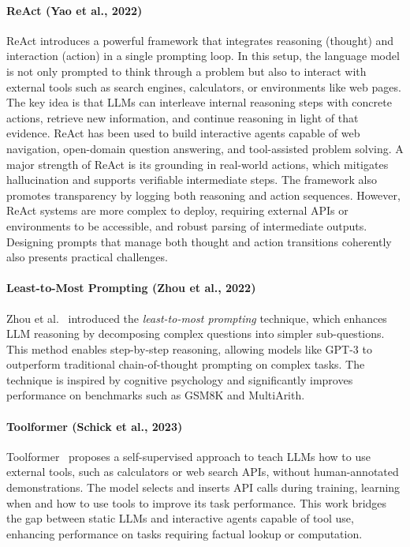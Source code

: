 \paragraph{ReAct (Yao et al., 2022)}
ReAct introduces a powerful framework that integrates reasoning (thought) and interaction (action) in a single prompting loop. In this setup, the language model is not only prompted to think through a problem but also to interact with external tools such as search engines, calculators, or environments like web pages. The key idea is that LLMs can interleave internal reasoning steps with concrete actions, retrieve new information, and continue reasoning in light of that evidence. ReAct has been used to build interactive agents capable of web navigation, open-domain question answering, and tool-assisted problem solving. A major strength of ReAct is its grounding in real-world actions, which mitigates hallucination and supports verifiable intermediate steps. The framework also promotes transparency by logging both reasoning and action sequences. However, ReAct systems are more complex to deploy, requiring external APIs or environments to be accessible, and robust parsing of intermediate outputs. Designing prompts that manage both thought and action transitions coherently also presents practical challenges.

\paragraph{Least-to-Most Prompting (Zhou et al., 2022)}  
Zhou et al.~\cite{zhou2022least} introduced the \emph{least-to-most prompting} technique, which enhances LLM reasoning by decomposing complex questions into simpler sub-questions. This method enables step-by-step reasoning, allowing models like GPT-3 to outperform traditional chain-of-thought prompting on complex tasks. The technique is inspired by cognitive psychology and significantly improves performance on benchmarks such as GSM8K and MultiArith.

\paragraph{Toolformer (Schick et al., 2023)}  
Toolformer~\cite{schick2023toolformer} proposes a self-supervised approach to teach LLMs how to use external tools, such as calculators or web search APIs, without human-annotated demonstrations. The model selects and inserts API calls during training, learning when and how to use tools to improve its task performance. This work bridges the gap between static LLMs and interactive agents capable of tool use, enhancing performance on tasks requiring factual lookup or computation.

